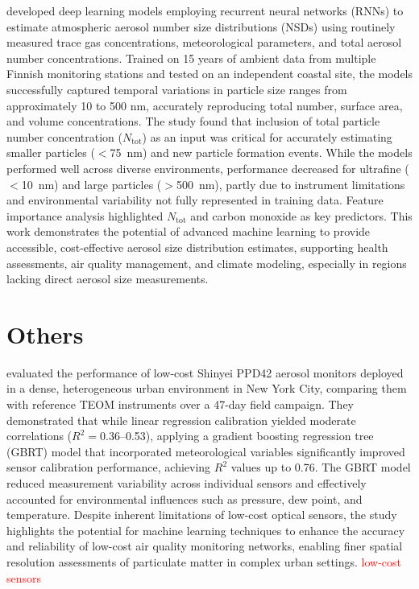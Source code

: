 \documentclass[11pt]{article}
\begin{document}
\citet{wu2025estimating} developed deep learning models employing recurrent neural networks (RNNs) to estimate atmospheric aerosol number size distributions (NSDs) using routinely measured trace gas concentrations, meteorological parameters, and total aerosol number concentrations. Trained on 15 years of ambient data from multiple Finnish monitoring stations and tested on an independent coastal site, the models successfully captured temporal variations in particle size ranges from approximately 10 to 500 nm, accurately reproducing total number, surface area, and volume concentrations. The study found that inclusion of total particle number concentration (\(N_{\text{tot}}\)) as an input was critical for accurately estimating smaller particles ($<$75~nm) and new particle formation events. While the models performed well across diverse environments, performance decreased for ultrafine ($<$10~nm) and large particles ($>$500~nm), partly due to instrument limitations and environmental variability not fully represented in training data. Feature importance analysis highlighted \(N_{\text{tot}}\) and carbon monoxide as key predictors. This work demonstrates the potential of advanced machine learning to provide accessible, cost-effective aerosol size distribution estimates, supporting health assessments, air quality management, and climate modeling, especially in regions lacking direct aerosol size measurements.

\section{Others}
\citet{johnson2018using} evaluated the performance of low-cost Shinyei PPD42 aerosol monitors deployed in a dense, heterogeneous urban environment in New York City, comparing them with reference TEOM instruments over a 47-day field campaign. They demonstrated that while linear regression calibration yielded moderate correlations (\(R^2 = 0.36\)–0.53), applying a gradient boosting regression tree (GBRT) model that incorporated meteorological variables significantly improved sensor calibration performance, achieving \(R^2\) values up to 0.76. The GBRT model reduced measurement variability across individual sensors and effectively accounted for environmental influences such as pressure, dew point, and temperature. Despite inherent limitations of low-cost optical sensors, the study highlights the potential for machine learning techniques to enhance the accuracy and reliability of low-cost air quality monitoring networks, enabling finer spatial resolution assessments of particulate matter in complex urban settings. \textcolor{red}{low-cost sensors}
\end{document}
